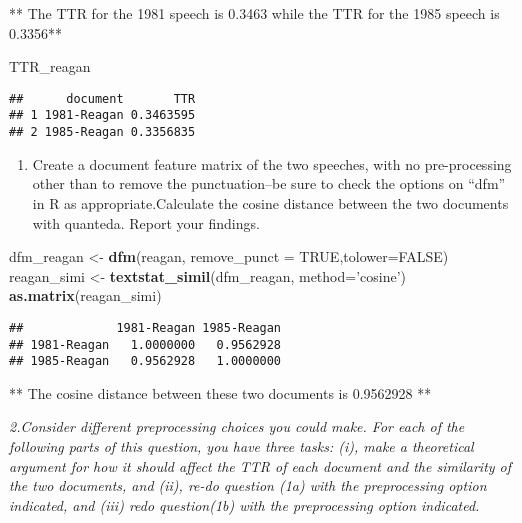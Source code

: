 \documentclass[]{article}
\newenvironment{Shaded}{\begin{snugshade}}{\end{snugshade}}
\newcommand{\KeywordTok}[1]{\textcolor[rgb]{0.13,0.29,0.53}{\textbf{#1}}}
\newcommand{\DataTypeTok}[1]{\textcolor[rgb]{0.13,0.29,0.53}{#1}}
\newcommand{\StringTok}[1]{\textcolor[rgb]{0.31,0.60,0.02}{#1}}
\newcommand{\OtherTok}[1]{\textcolor[rgb]{0.56,0.35,0.01}{#1}}
\newcommand{\NormalTok}[1]{#1}
\providecommand{\tightlist}{%
  \setlength{\itemsep}{0pt}\setlength{\parskip}{0pt}}
\begin{document}
** The TTR for the 1981 speech is 0.3463 while the TTR for the 1985
speech is 0.3356**

\begin{Shaded}
\begin{Highlighting}[]
\NormalTok{TTR_reagan}
\end{Highlighting}
\end{Shaded}

\begin{verbatim}
##      document       TTR
## 1 1981-Reagan 0.3463595
## 2 1985-Reagan 0.3356835
\end{verbatim}

\begin{enumerate}
\def\labelenumi{(\alph{enumi})}
\setcounter{enumi}{1}
\tightlist
\item
  Create a document feature matrix of the two speeches, with no
  pre-processing other than to remove the punctuation--be sure to check
  the options on ``dfm'' in R as appropriate.Calculate the cosine
  distance between the two documents with quanteda. Report your
  findings.
\end{enumerate}

\begin{Shaded}
\begin{Highlighting}[]
\NormalTok{dfm_reagan <-}\StringTok{ }\KeywordTok{dfm}\NormalTok{(reagan, }\DataTypeTok{remove_punct =} \OtherTok{TRUE}\NormalTok{,}\DataTypeTok{tolower=}\OtherTok{FALSE}\NormalTok{)}
\NormalTok{reagan_simi <-}\StringTok{ }\KeywordTok{textstat_simil}\NormalTok{(dfm_reagan, }\DataTypeTok{method=}\StringTok{'cosine'}\NormalTok{)}
\KeywordTok{as.matrix}\NormalTok{(reagan_simi)}
\end{Highlighting}
\end{Shaded}

\begin{verbatim}
##             1981-Reagan 1985-Reagan
## 1981-Reagan   1.0000000   0.9562928
## 1985-Reagan   0.9562928   1.0000000
\end{verbatim}

** The cosine distance between these two documents is 0.9562928 **

\emph{2.Consider different preprocessing choices you could make. For
each of the following parts of this question, you have three tasks: (i),
make a theoretical argument for how it should affect the TTR of each
document and the similarity of the two documents, and (ii), re-do
question (1a) with the preprocessing option indicated, and (iii) redo
question(1b) with the preprocessing option indicated.}
\end{document}
